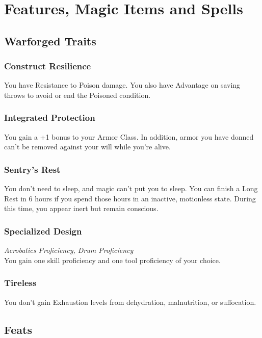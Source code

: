 \documentclass[letterpaper,openany,oneside,twocolumn]{book}
\begin{document}
\onecolumn


\rendercharactersheet

\renderbackgroundsheet

\renderspellsheet


\restoregeometry
\twocolumn

\chapter*{Features, Magic Items and Spells}

\section*{Warforged Traits}
\subsection*{Construct Resilience}
You have Resistance to Poison damage. You also have Advantage on saving throws to avoid or end the Poisoned condition.
\subsection*{Integrated Protection}
You gain a +1 bonus to your Armor Class. In addition, armor you have donned can't be removed against your will while you're alive.
\subsection*{Sentry's Rest}
You don't need to sleep, and magic can't put you to sleep. You can finish a Long Rest in 6 hours if you spend those hours in an inactive, motionless state. During this time, you appear inert but remain conscious.
\subsection*{Specialized Design}
\textit{Acrobatics Proficiency, Drum Proficiency}\\
You gain one skill proficiency and one tool proficiency of your choice.
\subsection*{Tireless}
You don't gain Exhaustion levels from dehydration, malnutrition, or suffocation.

\section*{Feats}
\end{document}
